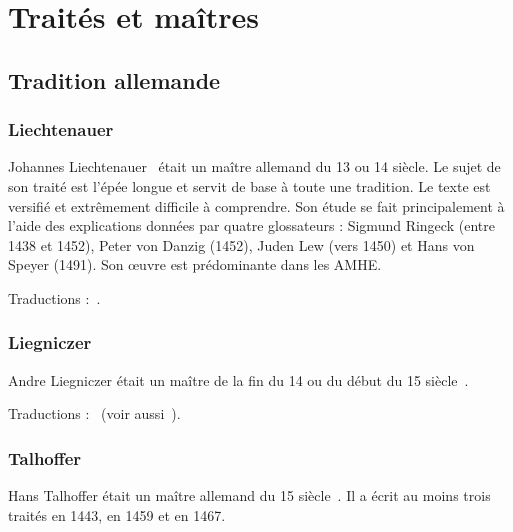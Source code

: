 \chapter{Traités et maîtres}


\section{Tradition allemande}


\subsection{Liechtenauer}
\label{app:maitres:liechtenauer}

Johannes Liechtenauer~\cite{wiktenauer:liechtenauer} était un maître allemand du 13\ieme{} ou 14\ieme{} siècle.
Le sujet de son traité est l'épée longue et servit de base à toute une tradition.
Le texte est versifié et extrêmement difficile à comprendre.
Son étude se fait principalement à l'aide des explications données par quatre glossateurs : Sigmund Ringeck (entre 1438 et 1452), Peter von Danzig (1452), Juden Lew (vers 1450) et Hans von Speyer (1491).
Son œuvre est prédominante dans les AMHE.

Traductions :~\cite{ardamhe:tetraptyque, farrell:ringeck, lindholm:ringeck_longsword:2008}.


\subsection{Liegniczer}
\label{app:maitres:liegniczer}

Andre Liegniczer était un maître de la fin du 14\ieme{} ou du début du 15\ieme{} siècle~\cite{wiktenauer:liegniczer}.

Traductions :~\cite{ardamhe:liegniczer, lindholm:ringeck_others:2006} (voir aussi~\cite{youtube:sala_armi:liegniczer, youtube:memag:liegniczer}).


\subsection{Talhoffer}
\label{app:maitres:talhoffer}

Hans Talhoffer était un maître allemand du 15\ieme{} siècle~\cite{wiktenauer:talhoffer}.
Il a écrit au moins trois traités en 1443, en 1459 et en 1467.

